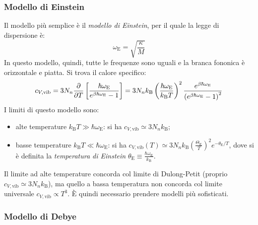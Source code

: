 \subsubsection{Modello di Einstein}

Il modello più semplice è il \textit{modello di Einstein}, per il quale la legge di dispersione è:
\begin{equation}
	\omega_\text{E} = \sqrt{\frac{\kappa}{M}}
\end{equation}
In questo modello, quindi, tutte le frequenze sono uguali e la branca fononica è orizzontale e piatta. Si trova il calore specifico:
\begin{equation*}
	c_{V,\text{vib}} = 3N_n \frac{\partial}{\partial T} \left[ \frac{\hbar \omega_\text{E}}{e^{\beta \hbar \omega_\text{E}} - 1} \right] = 3 N_n k_\text{B} \left( \frac{\hbar \omega_\text{E}}{k_\text{B} T} \right)^2 \frac{e^{\beta \hbar \omega_\text{E}}}{\left( e^{\beta \hbar \omega_\text{E}} - 1 \right)^2}
\end{equation*}
I limiti di questo modello sono:
\begin{itemize}
	\item alte temperature $ k_\text{B} T \gg \hbar \omega_\text{E} $: si ha $ c_{V,\text{vib}} \simeq 3 N_n k_\text{B} $;
	\item basse temperature $ k_\text{B} T \ll \hbar \omega_\text{E} $: si ha $ c_{V,\text{vib}}(T) \simeq 3 N_n k_\text{B} \left( \frac{\Theta_\text{E}}{T} \right)^2 e^{- \theta_\text{E} / T} $, dove si è definita la \textit{temperatura di Einstein} $ \theta_\text{E} \equiv \frac{\hbar \omega_\text{E}}{k_\text{B}} $.
\end{itemize}
Il limite ad alte temperature concorda col limite di Dulong-Petit (proprio $ c_{V,\text{vib}} \simeq 3 N_n k_\text{B} $), ma quello a bassa temperatura non concorda col limite universale $ c_{V,\text{vib}} \propto T^3 $. È quindi necessario prendere modelli più sofisticati.

\subsubsection{Modello di Debye}

